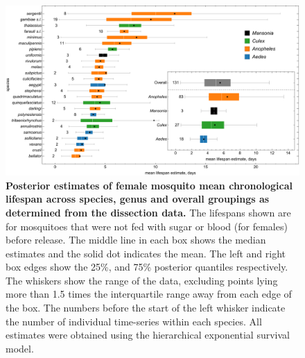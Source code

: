 \documentclass[12pt]{article}
\begin{document}
\begin{figure}[h]
	\centerline{\includegraphics[width=1\textwidth]{./Figure_files/dissection_lifetimes_exponential_chron.pdf}}
	\caption{\textbf{Posterior estimates of female mosquito mean chronological lifespan across species, genus and overall groupings as determined from the dissection data.} The lifespans shown are for mosquitoes that were not fed with sugar or blood (for females) before release. The middle line in each box shows the median estimates and the solid dot indicates the mean. The left and right box edges show the 25\%, and 75\% posterior quantiles respectively. The whiskers show the range of the data, excluding points lying more than 1.5 times the interquartile range away from each edge of the box. The numbers before the start of the left whisker indicate the number of individual time-series within each species. All estimates were obtained using the hierarchical exponential survival model.}
	\label{fig:dissection_lifetimes_exponential_chron}
\end{figure}
\end{document}
